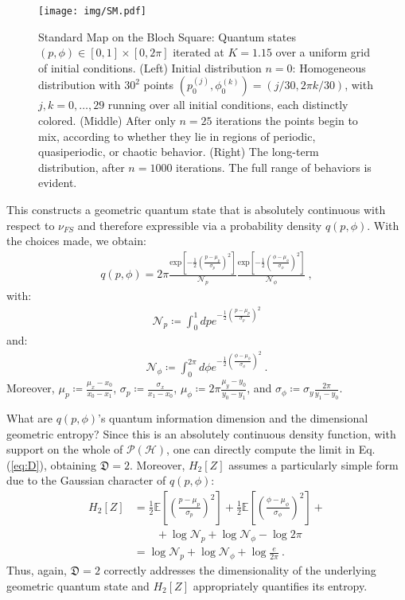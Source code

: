 \documentclass[draft,nofootinbib,pre,twocolumn,showkeys,superscriptaddress,preprintnumbers,floatfix]{revtex4-1}
\newcommand{\1}{\mathbbm{1}}
\newcommand{\PH}{\mathcal{P}(\mathcal{H})}
\begin{document}
\begin{figure*}
\texttt{[image: img/SM.pdf]}
\caption{Standard Map on the Bloch Square: Quantum states
	$(p,\phi) \in [0,1] \times [0,2\pi]$ iterated at $K=1.15$ over a uniform
	grid of initial conditions. (Left) Initial distribution $n=0$: Homogeneous
	distribution with $30^2$ points $(p_0^{(j)},\phi_0^{(k)}) = (j/30,2\pi
	k/30)$, with $j,k=0,\ldots,29$ running over all initial conditions, each
	distinctly colored. (Middle) After only $n=25$ iterations the points begin
	to mix, according to whether they lie in regions of periodic, quasiperiodic, 
	or chaotic behavior. (Right) The long-term distribution, after $n=1000$ 
	iterations. The full range of behaviors is evident.
	}
\label{fig:SM} 
\end{figure*}

This constructs a geometric quantum state that is absolutely continuous with
respect to $\nu_{FS}$ and therefore expressible via a probability density
$q(p,\phi)$. With the choices made, we obtain:
\begin{align*}
q(p,\phi) = 2 \pi \frac{\mathrm{exp} \left[{-\frac{1}{2} \left( \frac{p - \mu_p}{\sigma_p}\right)^2}\right]}{\mathcal{N}_p}
  \frac{\mathrm{exp}
  \left[{-\frac{1}{2}\left( \frac{\phi - \mu_\phi}{\sigma_\phi}\right)^2}\right]}{\mathcal{N}_\phi} 
  ~,
\end{align*}
with:
\begin{align*}
\mathcal{N}_p \coloneqq \int_0^1 dp
e^{-\frac{1}{2}\left(\frac{p-\mu_p}{\sigma_p}\right)^2}
\end{align*}
and:
\begin{align*}
\mathcal{N}_\phi
\coloneqq \int_0^{2\pi} d\phi
e^{-\frac{1}{2}\left(\frac{\phi-\mu_\phi}{\sigma_\phi}\right)^2}
~.
\end{align*}
Moreover, $\mu_p \coloneqq \frac{\mu_x - x_0}{x_0 - x_1}$, $\sigma_p \coloneqq
\frac{\sigma_x}{x_1 - x_0}$, $\mu_\phi \coloneqq 2\pi \frac{\mu_y - y_0}{y_0 -
y_1}$, and $\sigma_\phi \coloneqq \sigma_y \frac{2\pi}{y_1- y_0}$. 

What are $q(p,\phi)$'s quantum information dimension and the dimensional
geometric entropy? Since this is an absolutely continuous density function,
with support on the whole of $\PH$, one can directly compute the limit in
Eq. (\ref{eq:D}), obtaining $\mathfrak{D} = 2$. Moreover, $H_2[Z]$ assumes a
particularly simple form due to the Gaussian character of $q(p,\phi)$:
\begin{align*}
H_{2}[Z] & = \frac{1}{2}\mathbb{E} \left[ \left(\frac{p-\mu_p}{\sigma_p} \right)^2\right] + \frac{1}{2}\mathbb{E} \left[ \left(\frac{\phi-\mu_\phi}{\sigma_\phi} \right)^2\right] +\\
  & \qquad + \log \mathcal{N}_p + \log \mathcal{N}_{\phi} - \log 2\pi \\
  & = \log \mathcal{N}_p + \log \mathcal{N}_{\phi} + \log \frac{e}{2\pi}
  ~. 
\end{align*}
Thus, again, $\mathfrak{D}=2$ correctly addresses the dimensionality of the
underlying geometric quantum state and $H_2[Z]$ appropriately quantifies its
entropy.
\end{document}
